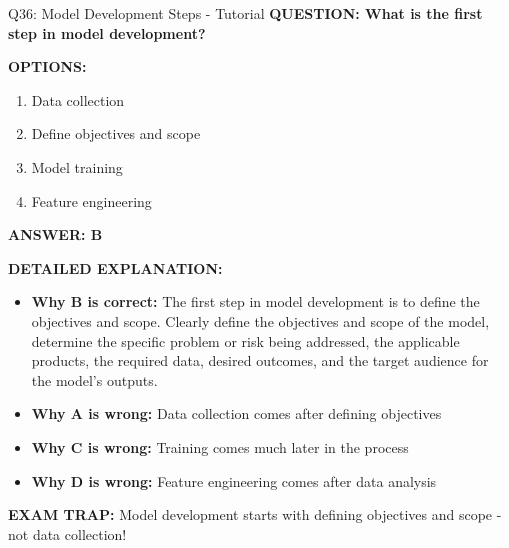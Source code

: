 \documentclass[8pt]{beamer}
\begin{document}
	\begin{frame}{Q36: Model Development Steps - Tutorial}
		\fontsize{6.5}{7.5}\selectfont
		\textbf{QUESTION: What is the first step in model development?}
		
		\vspace{0.1cm}
		\textbf{OPTIONS:}
		\begin{enumerate}
			\item Data collection
			\item Define objectives and scope
			\item Model training
			\item Feature engineering
		\end{enumerate}
		
		\vspace{0.1cm}
		\textcolor{myblue}{\textbf{ANSWER: B}}
		
		\vspace{0.1cm}
		\textbf{DETAILED EXPLANATION:}
		\begin{itemize}
			\item \textbf{Why B is correct:} The first step in model development is to define the objectives and scope. Clearly define the objectives and scope of the model, determine the specific problem or risk being addressed, the applicable products, the required data, desired outcomes, and the target audience for the model's outputs.
			\item \textbf{Why A is wrong:} Data collection comes after defining objectives
			\item \textbf{Why C is wrong:} Training comes much later in the process
			\item \textbf{Why D is wrong:} Feature engineering comes after data analysis
		\end{itemize}
		
		\textcolor{myred}{\textbf{EXAM TRAP:}} Model development starts with \textcolor{myblue}{defining objectives and scope} - not data collection!
	\end{frame}
	
\end{document}
